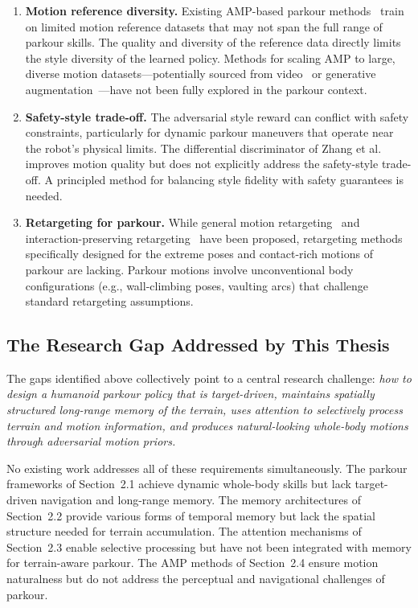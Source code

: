 \begin{enumerate}[leftmargin=2em]
\item \textbf{Motion reference diversity.} Existing AMP-based parkour methods~\cite{zhuang2024humanoidparkour,zhuang2024deepwholebody,wu2024perceptiveparkour} train on limited motion reference datasets that may not span the full range of parkour skills. The quality and diversity of the reference data directly limits the style diversity of the learned policy. Methods for scaling AMP to large, diverse motion datasets---potentially sourced from video~\cite{zhao2024aggressivelocomotion} or generative augmentation~\cite{xu2024parc}---have not been fully explored in the parkour context.

\item \textbf{Safety-style trade-off.} The adversarial style reward can conflict with safety constraints, particularly for dynamic parkour maneuvers that operate near the robot's physical limits. The differential discriminator of Zhang et al.~\cite{zhang2024advdiscriminators} improves motion quality but does not explicitly address the safety-style trade-off. A principled method for balancing style fidelity with safety guarantees is needed.

\item \textbf{Retargeting for parkour.} While general motion retargeting~\cite{araujo2024retargeting} and interaction-preserving retargeting~\cite{yang2024omniretarget} have been proposed, retargeting methods specifically designed for the extreme poses and contact-rich motions of parkour are lacking. Parkour motions involve unconventional body configurations (e.g., wall-climbing poses, vaulting arcs) that challenge standard retargeting assumptions.
\end{enumerate}

\subsection{The Research Gap Addressed by This Thesis}

The gaps identified above collectively point to a central research challenge: \emph{how to design a humanoid parkour policy that is target-driven, maintains spatially structured long-range memory of the terrain, uses attention to selectively process terrain and motion information, and produces natural-looking whole-body motions through adversarial motion priors.}

No existing work addresses all of these requirements simultaneously. The parkour frameworks of Section~2.1 achieve dynamic whole-body skills but lack target-driven navigation and long-range memory. The memory architectures of Section~2.2 provide various forms of temporal memory but lack the spatial structure needed for terrain accumulation. The attention mechanisms of Section~2.3 enable selective processing but have not been integrated with memory for terrain-aware parkour. The AMP methods of Section~2.4 ensure motion naturalness but do not address the perceptual and navigational challenges of parkour.

